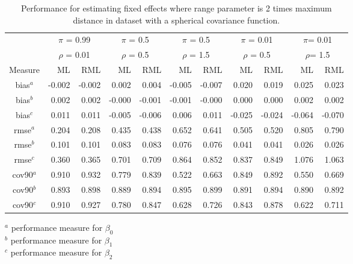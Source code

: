\documentclass[12pt, titlepage]{article}
\begin{document}
\begin{table}[h]
				\caption{Performance for estimating fixed effects where range parameter is 2 times maximum distance in dataset with a spherical covariance function.}
\begin{center}
\begin{tabular}{c|rr|rr|rr|rr|rr}
  \hline
  \hline
  & \multicolumn{2}{|c|}{$\pi$ = 0.99} & \multicolumn{2}{|c|}{$\pi$ = 0.5}  
  & \multicolumn{2}{|c|}{$\pi$ = 0.5} & \multicolumn{2}{|c}{$\pi$ = 0.01} 
  & \multicolumn{2}{|c}{$\pi$= 0.01} \\
  & \multicolumn{2}{|c|}{$\rho$ = 0.01} & \multicolumn{2}{|c|}{$\rho$ = 0.5}  
  & \multicolumn{2}{|c|}{$\rho$ = 1.5} & \multicolumn{2}{|c}{$\rho$ = 0.5} 
  & \multicolumn{2}{|c}{$\rho$= 1.5} \\
  Measure & ML & RML & ML & RML & ML & RML & ML & RML & ML & RML \\
	\hline
  \hline
	bias$^a$ & -0.002 & -0.002 & 0.002 & 0.004 & -0.005 & -0.007 & 0.020 & 0.019 & 0.025 & 0.023 \\ 
	bias$^b$ &  0.002 & 0.002 & -0.000 & -0.001 & -0.001 & -0.000 & 0.000 & 0.000 & 0.002 & 0.002 \\ 
	bias$^c$ &   0.011 & 0.011 & -0.005 & -0.006 & 0.006 & 0.011 & -0.025 & -0.024 & -0.064 & -0.070 \\ 
	rmse$^a$ &   0.204 & 0.208 & 0.435 & 0.438 & 0.652 & 0.641 & 0.505 & 0.520 & 0.805 & 0.790 \\ 
	rmse$^b$ &   0.101 & 0.101 & 0.083 & 0.083 & 0.076 & 0.076 & 0.041 & 0.041 & 0.026 & 0.026 \\ 
	rmse$^c$ &   0.360 & 0.365 & 0.701 & 0.709 & 0.864 & 0.852 & 0.837 & 0.849 & 1.076 & 1.063 \\ 
	cov90$^a$ &   0.910 & 0.932 & 0.779 & 0.839 & 0.522 & 0.663 & 0.849 & 0.892 & 0.550 & 0.669 \\ 
	cov90$^b$ &   0.893 & 0.898 & 0.889 & 0.894 & 0.895 & 0.899 & 0.891 & 0.894 & 0.890 & 0.892 \\ 
	cov90$^c$ &   0.910 & 0.927 & 0.780 & 0.847 & 0.628 & 0.726 & 0.843 & 0.878 & 0.622 & 0.711 \\ 
  \hline
	\hline
\end{tabular}
\end{center}
$^a$ performance measure for $\beta_0$ \\
$^b$ performance measure for $\beta_1$ \\
$^c$ performance measure for $\beta_2$ \\
\end{table}
\end{document}
